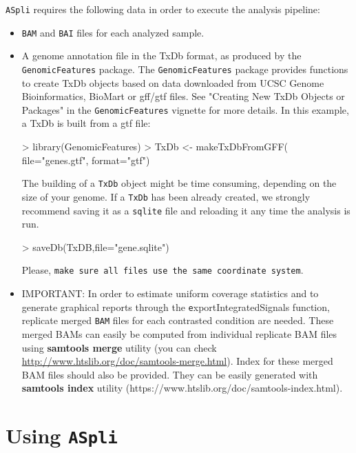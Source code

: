 \documentclass{article}
\begin{document}
\texttt{ASpli} requires the following data in order to execute the analysis pipeline:
\begin{itemize}
\item \texttt{BAM} and \texttt{BAI} files for each analyzed sample.
\item A genome annotation file in the TxDb format, as produced by the \texttt{GenomicFeatures} package.
The \texttt{GenomicFeatures} package provides functions to create TxDb objects based on data downloaded from
UCSC Genome Bioinformatics, BioMart or gff/gtf files. 
See "Creating New TxDb Objects or Packages" in the \texttt{GenomicFeatures} vignette for more details. In this example, a TxDb is built from a gtf file:

\begin{Schunk}
\begin{Sinput}
> library(GenomicFeatures)
> TxDb <- makeTxDbFromGFF(
   file="genes.gtf",
   format="gtf")
\end{Sinput}
\end{Schunk}


The building of a \texttt{TxDb} object might be time consuming, depending on the size of your genome. If a \texttt{TxDb} has been already created, we strongly recommend saving it as a \texttt{sqlite} file and reloading it any time the analysis is run. 

\begin{Schunk}
\begin{Sinput}
>  saveDb(TxDB,file="gene.sqlite")
\end{Sinput}
\end{Schunk}

Please, \texttt{make sure all files use the same coordinate system}.
\item IMPORTANT: In order to estimate uniform coverage statistics and to generate graphical reports through the {\texttt exportIntegratedSignals} function, replicate merged \texttt{BAM} files for each contrasted condition are needed. These merged BAMs can easily be computed from individual replicate BAM files using {\bf samtools merge} utility (you can check \hyperref[samtools]{http://www.htslib.org/doc/samtools-merge.html}). Index for these merged BAM files should also be provided. They can be easily generated with {\bf samtools index} utility (https://www.htslib.org/doc/samtools-index.html).

\end{itemize}

\section{Using \texttt{ASpli}}
\end{document}
